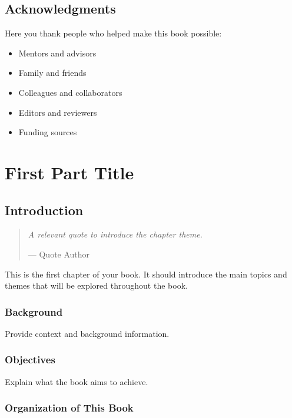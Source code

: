 \documentclass[11pt,a4paper,oneside]{book}
\newcommand{\chapterquote}[2]{%
    \begin{quotation}
        \em #1
        \begin{flushright}
            --- #2
        \end{flushright}
    \end{quotation}
}
\begin{document}
\chapter{Acknowledgments}

Here you thank people who helped make this book possible:
\begin{itemize}
    \item Mentors and advisors
    \item Family and friends
    \item Colleagues and collaborators
    \item Editors and reviewers
    \item Funding sources
\end{itemize}


\mainmatter

\part{First Part Title}

\chapter{Introduction}
\label{chap:intro}

\chapterquote{A relevant quote to introduce the chapter theme.}{Quote Author}

This is the first chapter of your book. It should introduce the main topics 
and themes that will be explored throughout the book.

\section{Background}
\label{sec:background}

Provide context and background information.

\section{Objectives}
\label{sec:objectives}

Explain what the book aims to achieve.

\section{Organization of This Book}
\label{sec:organization}
\end{document}
